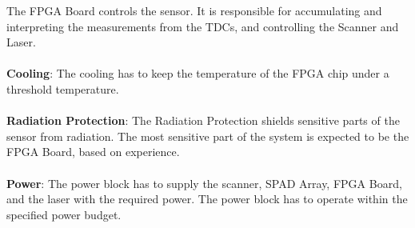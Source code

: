 The FPGA Board controls the sensor. It is responsible for accumulating and interpreting the measurements from the TDCs, and controlling the Scanner and Laser. \\
\\
\textbf{Cooling}:
The cooling has to keep the temperature of the FPGA chip under a threshold temperature.\\
\\
\textbf{Radiation Protection}:
The Radiation Protection shields sensitive parts of the sensor from radiation. The most sensitive part of the system is expected to be the FPGA Board, based on experience.\\
\\
\textbf{Power}:
The power block has to supply the scanner, SPAD Array, FPGA Board, and the laser with the required power. The power block has to operate within the specified power budget.










